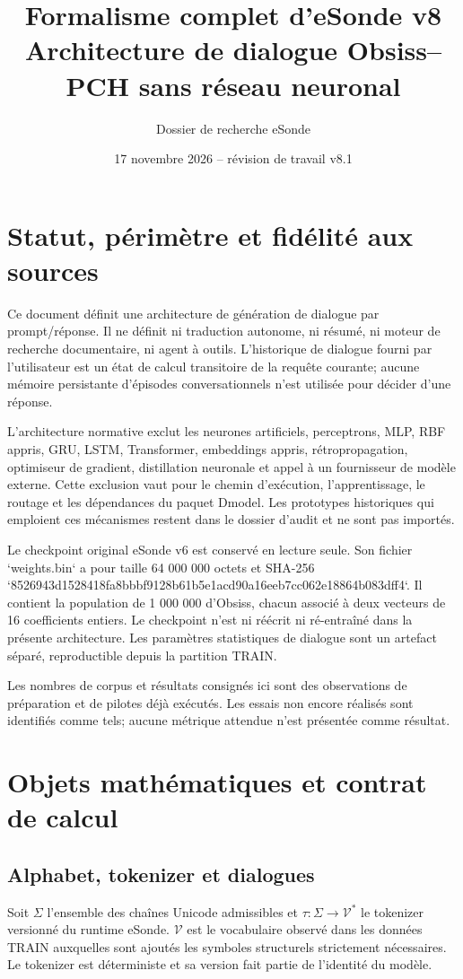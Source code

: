 \documentclass[11pt,a4paper]{report}
\title{Formalisme complet d'eSonde v8\\Architecture de dialogue Obsiss--PCH sans réseau neuronal}
\author{Dossier de recherche eSonde}
\date{17 novembre 2026 -- révision de travail v8.1}
\newcommand{\V}{\mathcal V}
\begin{document}
\maketitle
\tableofcontents

\chapter*{Statut, périmètre et fidélité aux sources}
Ce document définit une architecture de génération de dialogue par prompt/réponse. Il ne définit ni traduction autonome, ni résumé, ni moteur de recherche documentaire, ni agent à outils. L'historique de dialogue fourni par l'utilisateur est un état de calcul transitoire de la requête courante; aucune mémoire persistante d'épisodes conversationnels n'est utilisée pour décider d'une réponse.

L'architecture normative exclut les neurones artificiels, perceptrons, MLP, RBF appris, GRU, LSTM, Transformer, embeddings appris, rétropropagation, optimiseur de gradient, distillation neuronale et appel à un fournisseur de modèle externe. Cette exclusion vaut pour le chemin d'exécution, l'apprentissage, le routage et les dépendances du paquet Dmodel. Les prototypes historiques qui emploient ces mécanismes restent dans le dossier d'audit et ne sont pas importés.

Le checkpoint original eSonde v6 est conservé en lecture seule. Son fichier `weights.bin` a pour taille 64 000 000 octets et SHA-256 `8526943d1528418fa8bbbf9128b61b5e1acd90a16eeb7cc062e18864b083dff4`. Il contient la population de 1 000 000 d'Obsiss, chacun associé à deux vecteurs de 16 coefficients entiers. Le checkpoint n'est ni réécrit ni ré-entraîné dans la présente architecture. Les paramètres statistiques de dialogue sont un artefact séparé, reproductible depuis la partition TRAIN.

Les nombres de corpus et résultats consignés ici sont des observations de préparation et de pilotes déjà exécutés. Les essais non encore réalisés sont identifiés comme tels; aucune métrique attendue n'est présentée comme résultat.

\chapter{Objets mathématiques et contrat de calcul}
\section{Alphabet, tokenizer et dialogues}
Soit $\Sigma$ l'ensemble des chaînes Unicode admissibles et $\tau:\Sigma\to\V^*$ le tokenizer versionné du runtime eSonde. $\V$ est le vocabulaire observé dans les données TRAIN auxquelles sont ajoutés les symboles structurels strictement nécessaires. Le tokenizer est déterministe et sa version fait partie de l'identité du modèle.
\end{document}

